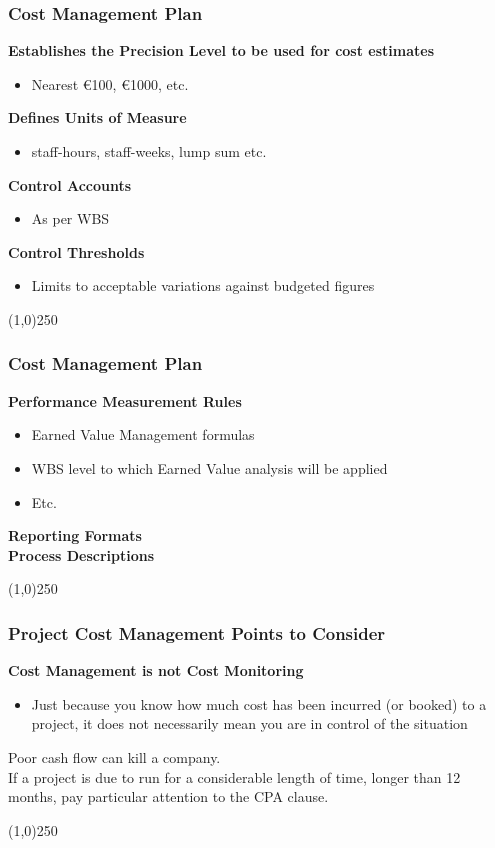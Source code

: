 \begin{frame}
\frametitle{Cost Management Plan}
\textbf{Establishes the Precision Level to be used for cost estimates}
\begin{itemize}
	\item Nearest \euro100, \euro1000, etc.
\end{itemize}
\textbf{Defines Units of Measure}
\begin{itemize}
	\item staff-hours, staff-weeks, lump sum etc.
\end{itemize}
\textbf{Control Accounts}
\begin{itemize}
	\item As per WBS
\end{itemize}
\textbf{Control Thresholds}
\begin{itemize}
	\item Limits to acceptable variations against budgeted figures
\end{itemize}
\end{frame}
\begin{center}\line(1,0){250}\end{center}






\begin{frame}
\frametitle{Cost Management Plan}
\textbf{Performance Measurement Rules}
\begin{itemize}
	\item Earned Value Management formulas
	\item WBS level to which Earned Value analysis will be applied
	\item Etc.
\end{itemize}
\textbf{Reporting Formats}\\
\textbf{Process Descriptions}
\end{frame}
\begin{center}\line(1,0){250}\end{center}






\begin{frame}
\frametitle{Project Cost Management \hfill Points to Consider}
\textbf{Cost Management is not Cost Monitoring}
\begin{itemize}
	\item Just because you know how much cost has been incurred (or booked) to a project, it does not necessarily mean you are in control of the situation
\end{itemize}
Poor cash flow can kill a company.\\
If a project is due to run for a considerable length of time, longer than 12 months, pay particular attention to the CPA clause.

\end{frame}
\begin{center}\line(1,0){250}\end{center}







